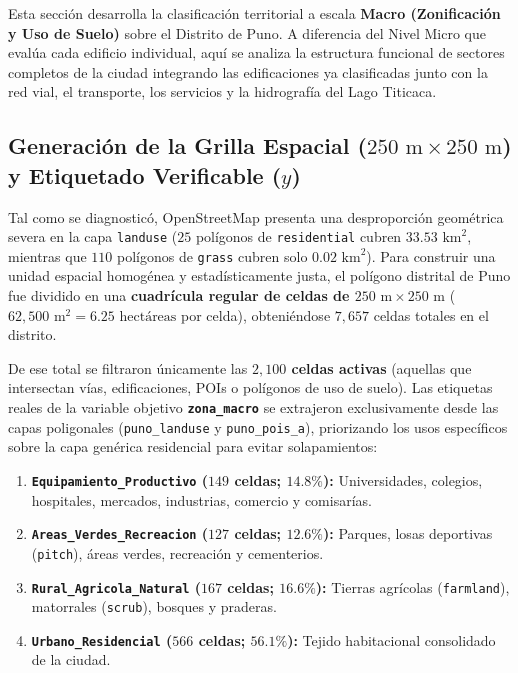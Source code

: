 \documentclass[11pt,a4paper]{article}
\begin{document}
Esta sección desarrolla la clasificación territorial a escala \textbf{Macro (Zonificación y Uso de Suelo)} sobre el Distrito de Puno. A diferencia del Nivel Micro que evalúa cada edificio individual, aquí se analiza la estructura funcional de sectores completos de la ciudad integrando las edificaciones ya clasificadas junto con la red vial, el transporte, los servicios y la hidrografía del Lago Titicaca.

\subsection{Generación de la Grilla Espacial ($250\text{ m} \times 250\text{ m}$) y Etiquetado Verificable ($y$)}

Tal como se diagnosticó, OpenStreetMap presenta una desproporción geométrica severa en la capa \texttt{landuse} ($25$ polígonos de \texttt{residential} cubren $33.53\text{ km}^2$, mientras que $110$ polígonos de \texttt{grass} cubren solo $0.02\text{ km}^2$). Para construir una unidad espacial homogénea y estadísticamente justa, el polígono distrital de Puno fue dividido en una \textbf{cuadrícula regular de celdas de $250\text{ m} \times 250\text{ m}$} ($62{,}500\text{ m}^2 = 6.25\text{ hectáreas}$ por celda), obteniéndose $7{,}657$ celdas totales en el distrito.

De ese total se filtraron únicamente las \textbf{$2{,}100$ celdas activas} (aquellas que intersectan vías, edificaciones, POIs o polígonos de uso de suelo). Las etiquetas reales de la variable objetivo \textbf{\texttt{zona\_macro}} se extrajeron exclusivamente desde las capas poligonales (\texttt{puno\_landuse} y \texttt{puno\_pois\_a}), priorizando los usos específicos sobre la capa genérica residencial para evitar solapamientos:
\begin{enumerate}[leftmargin=0.85cm, itemsep=2pt]
    \item \textbf{\texttt{Equipamiento\_Productivo} ($149$ celdas; $14.8\%$):} Universidades, colegios, hospitales, mercados, industrias, comercio y comisarías.
    \item \textbf{\texttt{Areas\_Verdes\_Recreacion} ($127$ celdas; $12.6\%$):} Parques, losas deportivas (\texttt{pitch}), áreas verdes, recreación y cementerios.
    \item \textbf{\texttt{Rural\_Agricola\_Natural} ($167$ celdas; $16.6\%$):} Tierras agrícolas (\texttt{farmland}), matorrales (\texttt{scrub}), bosques y praderas.
    \item \textbf{\texttt{Urbano\_Residencial} ($566$ celdas; $56.1\%$):} Tejido habitacional consolidado de la ciudad.
\end{enumerate}
\end{document}
